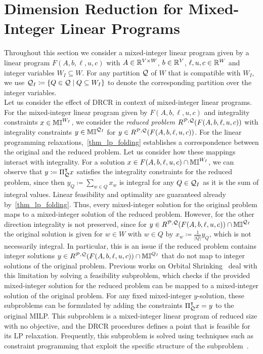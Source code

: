 \documentclass[pdflatex,sn-mathphys-num]{sn-jnl}%
\theoremstyle{thmstyleone}%
\theoremstyle{thmstylethree}%
\theoremstyle{thmstyletwo}%
\begin{document}
\section{Dimension Reduction for Mixed-Integer Linear Programs}
\label{sec_dimred_milp}

Throughout this section we consider a mixed-integer linear program given by a linear program $F(A,b,\ell,u,c)$ with $A\in\mathbb{R}^{V\times W}$, $b\in \mathbb{R}^V$, $\ell, u, c \in \mathbb{R}^W$ and integer variables $W_I \subseteq W$. For any partition $\mathcal{Q}$ of $W$ that is compatible with $W_I$, we use $\MQ_I \coloneqq \{Q \in \MQ \mid Q \subseteq W_I\}$ to denote the corresponding partition over the integer variables.\\

Let us consider the effect of DRCR in context of mixed-integer linear programs.
For the mixed-integer linear program given by $F(A,b,\ell,u,c)$ and integrality constraints $x \in \mathbb{MI}^{W_I}$, we consider the \emph{reduced problem} $R^{\mathcal{P},\mathcal{Q}}(F(A,b,\ell,u,c))$ with integrality constraints $y\in \mathbb{MI}^{\mathcal{Q}_I}$ for $y\in R^{\mathcal{P},\mathcal{Q}}(F(A,b,\ell,u,c))$. 
For the linear programming relaxations,~\cref{thm_lp_folding} establishes a correspondence between the original and the reduced problem. Let us consider how these mappings interact with integrality. For a solution $x\in F(A,b,\ell,u,c)\cap \mathbb{MI}^{W_I}$, we can observe that $y \coloneqq \transpose{\Pi_{\MQ}} x$ satisfies the integrality constraints for the reduced problem, since then $y_Q \coloneqq \sum_{w\in Q} x_w$ is integral for any $Q\in \mathcal{Q}_I$ as it is the sum of integral values. Linear feasibility and optimality are guaranteed already by~\cref{thm_lp_folding}.
Thus, every mixed-integer solution for the original problem maps to a mixed-integer solution of the reduced problem. However, for the other direction integrality is not preserved, since for $y\in R^{\mathcal{P},\mathcal{Q}}(F(A,b,\ell,u,c))\cap \mathbb{MI}^{\mathcal{Q}_I}$ the original solution is given for $w\in W$ with $w\in Q$ by $x_w \coloneqq \frac{1}{|Q|} y_Q$, which is not necessarily integral. In particular, this is an issue if the reduced problem contains integer solutions $y\in R^{\mathcal{P},\mathcal{Q}}(F(A,b,\ell,u,c)) \cap \mathbb{MI}^{Q_I}$ that do not map to integer solutions of the original problem.
Previous works on Orbital Shrinking~\cite{Fischetti2012,Fischetti2017,Salvagnin2013} deal with this limitation by solving a feasibility subproblem, which checks if the provided mixed-integer solution for the reduced problem can be mapped to a mixed-integer solution of the original problem. For any fixed mixed-integer $y$-solution, these subproblems can be formulated by adding the constraints $ \Pi_{\mathcal{Q}}^{\intercal} x = y$ to the original MILP. 
This subproblem is a mixed-integer linear program of reduced size with no objective, and the DRCR procedures defines a point that is feasible for its LP relaxation. 
Frequently, this subproblem is solved using techniques such as constraint programming that exploit the specific structure of the subproblem~\cite{Salvagnin2012, Salvagnin2013}.\\
\end{document}
